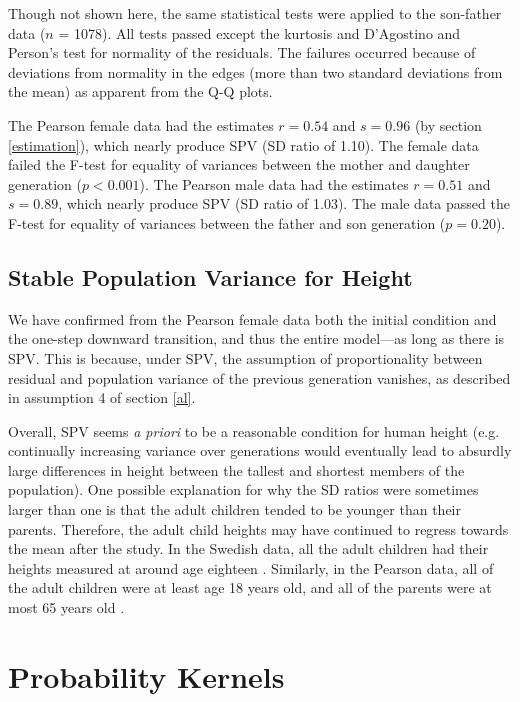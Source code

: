 \documentclass{svproc} %
\begin{document}
Though not shown here, the same statistical tests were applied to the son-father data ($n$ = 1078). All tests passed except the kurtosis and D'Agostino and Person's test for normality of the residuals. The failures occurred because of deviations from normality in the edges (more than two standard deviations from the mean) as apparent from the Q-Q plots.

The Pearson female data had the estimates $r = 0.54$ and $s = 0.96$ (by section \ref{estimation}), which nearly produce SPV (SD ratio of 1.10). The female data failed the F-test for equality of variances between the mother and daughter generation ($p < 0.001$). The Pearson male data had the estimates $r = 0.51$ and $s = 0.89$, which nearly produce SPV (SD ratio of 1.03). The male data passed the F-test for equality of variances between the father and son generation ($p = 0.20$). 


\subsection{Stable Population Variance for Height}

We have confirmed from the Pearson female data both the initial condition and the one-step downward transition, and thus the entire model---as long as there is SPV. This is because, under SPV, the assumption of proportionality between residual and population variance of the previous generation vanishes, as described in assumption 4 of section \ref{al}. 

Overall, SPV seems \emph{a priori} to be a reasonable condition for human height (e.g. continually increasing variance over generations would eventually lead to absurdly large differences in height between the tallest and shortest members of the population). One possible explanation for why the SD ratios were sometimes larger than one is that the adult children tended to be younger than their parents. Therefore, the adult child heights may have continued to regress towards the mean after the study. In the Swedish data, all the adult children had their heights measured at around age eighteen \cite{karlberg}. Similarly, in the Pearson data, all of the adult children were at least age 18 years old, and all of the parents were at most 65 years old \cite{pearson}. 


\section{Probability Kernels}
\end{document}
